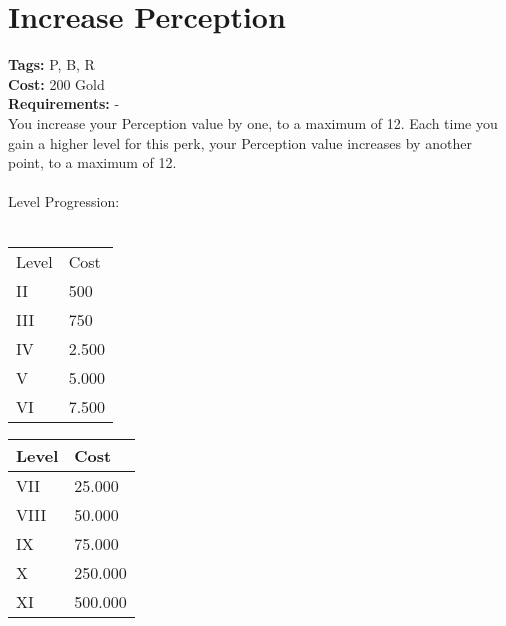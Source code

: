 \section{Increase Perception}\label{sec:increaseperception}
\textbf{Tags:} P, B, R\\
\textbf{Cost:} 200 Gold\\
\textbf{Requirements:} -\\
You increase your Perception value by one, to a maximum of 12.
Each time you gain a higher level for this perk, your Perception value increases by another point, to a maximum of 12.\\
\\
Level Progression:\\
\\
\begin{minipage}{0.5\textwidth}
    \begin{tabular}{l | l}
        Level & Cost\\
        II & 500\\
        III & 750\\
        IV & 2.500\\
        V & 5.000\\
        VI & 7.500\\
    \end{tabular}
\end{minipage}
\begin{minipage}{0.5\textwidth}
    \begin{tabular}{l | l}
        Level & Cost\\ \hline
        VII & 25.000\\
        VIII & 50.000\\
        IX & 75.000\\
        X & 250.000\\
        XI & 500.000\\
    \end{tabular}
\end{minipage}